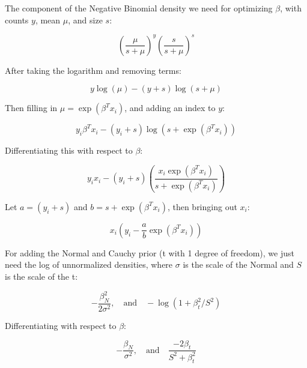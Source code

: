 \documentclass{article}
\begin{document}
The component of the Negative Binomial density we need for optimizing
$\beta$, with counts $y$, mean $\mu$, and size $s$:

\[ \left( \frac{\mu}{s+\mu} \right)^y \left( \frac{s}{s+\mu} \right)^s \]

After taking the logarithm and removing terms:

\[ y \log(\mu) - (y + s) \log(s + \mu) \]

Then filling in $\mu = \exp(\beta^T x_i)$, and adding an index to $y$:

\[ y_i \beta^T x_i - (y_i + s) \log(s + \exp(\beta^T x_i)) \]

Differentiating this with respect to $\beta$:

\[ y_i x_i - (y_i + s) \left( \frac{x_i \exp(\beta^T x_i)}{s +
  \exp(\beta^T x_i)} \right) \]

Let $a = (y_i + s)$ and $b = s + \exp(\beta^T x_i)$, then bringing out $x_i$:

\[ x_i \left( y_i - \frac{a}{b} \exp(\beta^T x_i) \right) \]

For adding the Normal and Cauchy prior (t with 1 degree of freedom),
we just need the log of unnormalized densities, where $\sigma$ is the
scale of the Normal and $S$ is the scale of the t:

\[ -\frac{\beta_N^2}{2 \sigma^2}, \quad \textrm{and} \quad  -\log(1 + \beta_t^2/S^2) \]

Differentiating with respect to $\beta$:

\[ -\frac{\beta_N}{\sigma^2}, \quad \textrm{and} \quad  \frac{-2
  \beta_t}{S^2 + \beta_t^2} \]
\end{document}
